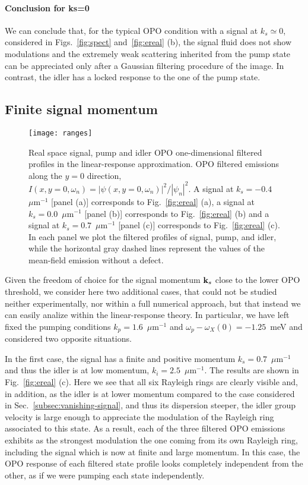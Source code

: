 \paragraph{Conclusion for ks=0}
We can conclude that, for the typical OPO condition with a signal at
$k_s \simeq 0$, considered in Figs.~\ref{fig:spect}
and~\ref{fig:ereal} (b), the signal fluid does not show modulations
and the extremely weak scattering inherited from the pump state can be
appreciated only after a Gaussian filtering procedure of the image. In
contrast, the idler has a locked response to the one of the pump
state.

\subsection{Finite signal momentum}
\label{subsec:finite-signal}
%
\begin{figure}[tb]\centering
\texttt{[image: ranges]}
\caption{Real space signal, pump and idler OPO one-dimensional
  filtered profiles in the linear-response approximation. OPO filtered
  emissions along the $y=0$ direction, $I (x, y=0, \omega_n) =
  |\psi(x,y=0, \omega_n)|^2/|\psi_n|^2$.  A signal at $k_s =
  -0.4$~$\mu$m$^{-1}$ [panel (a)] corresponds to Fig.~\ref{fig:ereal}
  (a), a signal at $k_s = 0.0$~$\mu$m$^{-1}$ [panel (b)] corresponds to
  Fig.~\ref{fig:ereal} (b) and a signal at $k_s = 0.7$~$\mu$m$^{-1}$
  [panel (c)] corresponds to Fig.~\ref{fig:ereal} (c). In each panel we
  plot the filtered profiles of signal, pump, and idler, while the
  horizontal gray dashed lines represent the values of the mean-field
  emission without a defect.}
\label{fig:range}
\end{figure}
%
Given the freedom of choice for the signal momentum $\mathbf{k}_s$ close
to the lower OPO threshold, we consider here two additional cases,
that could not be studied neither experimentally, nor within a full
numerical approach, but that instead we can easily analize within the
linear-response theory.
%
In particular, we have left fixed the pumping conditions
$k_p=1.6$~$\mu$m$^{-1}$ and $\omega_p-\omega_X(0)=-1.25$~meV and
considered two opposite situations.

In the first case, the signal has a finite and positive momentum
$k_s = 0.7$~$\mu$m$^{-1}$ and thus the idler is at low momentum,
$k_i =2.5$~$\mu$m$^{-1}$. The results are shown in
Fig.~\ref{fig:ereal} (c).
%
Here we see that all six Rayleigh rings are clearly visible and, in
addition, as the idler is at lower momentum compared to the case
considered in Sec.~\ref{subsec:vanishing-signal}, and thus its
dispersion steeper, the idler group velocity is large enough to
appreciate the modulation of the Rayleigh ring associated to this
state. As a result, each of the three filtered OPO emissions exhibits
as the strongest modulation the one coming from its own Rayleigh ring,
including the signal which is now at finite and large momentum. In
this case, the OPO response of each filtered state profile looks
completely independent from the other, as if we were pumping each
state independently.

